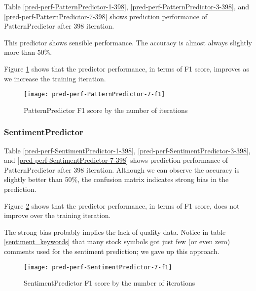 \documentclass[twocolumn,10pt]{asme2ej}
\begin{document}
Table \ref{pred-perf-PatternPredictor-1-398},
\ref{pred-perf-PatternPredictor-3-398}, and
\ref{pred-perf-PatternPredictor-7-398} shows prediction performance of
PatternPredictor after 398 iteration.

This predictor shows sensible performance. The accuracy is almost
always slightly more than 50\%. 

Figure \ref{pred-perf-PatternPredictor-7-f1} shows that the predictor
performance, in terms of F1 score, improves as we increase the
training iteration.

\begin{figure}
  \centering
  \texttt{[image: pred-perf-PatternPredictor-7-f1]}
  \caption{PatternPredictor F1 score by the number of iterations}
  \label{pred-perf-PatternPredictor-7-f1}
\end{figure}

\subsubsection{SentimentPredictor}

Table \ref{pred-perf-SentimentPredictor-1-398},
\ref{pred-perf-SentimentPredictor-3-398}, and
\ref{pred-perf-SentimentPredictor-7-398} shows prediction performance
of PatternPredictor after 398 iteration. Although we can observe the
accuracy is slightly better than 50\%, the confusion matrix indicates
strong bias in the prediction.

Figure \ref{pred-perf-SentimentPredictor-7-f1} shows that the predictor
performance, in terms of F1 score, does not improve over the training
iteration. 

The strong bias probably implies the lack of quality data. Notice in
table \ref{sentiment_keywords} that many stock symbols got just few
(or even zero) comments used for the sentiment prediction; we gave up
this approach.

\begin{figure}
  \centering
  \texttt{[image: pred-perf-SentimentPredictor-7-f1]}
  \caption{SentimentPredictor F1 score by the number of iterations}
  \label{pred-perf-SentimentPredictor-7-f1}
\end{figure}
\end{document}
